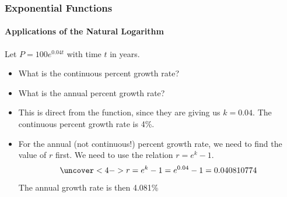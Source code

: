 \documentclass[9pt,xcolor=x11names,compress]{beamer}
\begin{document}
\begin{frame} \frametitle{Exponential Functions}
   \framesubtitle{Applications of the Natural Logarithm} 
   \begin{example}
    Let $P=100 e^{0.04t}$ with time $t$ in years.
    \begin{itemize}
        \item \alert<2>{What is the continuous percent growth rate?}
        \item \alert<3->{What is the annual percent growth rate?}
      \end{itemize} 
   \end{example}
   \begin{itemize}
    \item<2-> This is direct from the function, since they are giving us $k=0.04$.  The continuous percent growth rate is 4\%.
    \item<3-> For the annual (not continuous!) percent growth rate, we need to find the value of $r$ first.  We need to use the relation $r=e^k-1$.
    \begin{equation*}
      \uncover<4->{r=e^k-1=e^{0.04}-1=0.040810774}
    \end{equation*}
    \pause\pause\pause\pause \alert{The annual growth rate is then 4.081\%}
   \end{itemize}
\end{frame}
\end{document}
